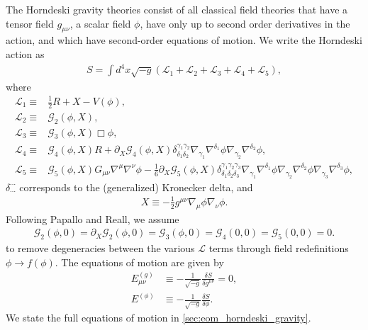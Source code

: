 \documentclass{ws-ijmpd}
\begin{document}
The Horndeski gravity theories consist of all classical field theories
that have a tensor field $g_{\mu\nu}$, a scalar field $\phi$, 
have only up to second order derivatives in the action,
and which have second-order equations of 
motion\cite{horndeski_paper,Deffayet:2009wt,Deffayet:2011gz}.
We write the Horndeski action as
\begin{align}
\label{eq:general_horndeski_action}
   S
   =
   \int d^4x\sqrt{-g}
   \left(
      \mathcal{L}_1
      +
      \mathcal{L}_2
      +
      \mathcal{L}_3
      +
      \mathcal{L}_4
      +
      \mathcal{L}_5
   \right)
   ,
\end{align}
where
\begin{align}
   \mathcal{L}_1
   \equiv&
   \frac{1}{2}R
   +
   X
   -
   V\left(\phi\right)
   ,\\
   \mathcal{L}_2
   \equiv&
   \mathcal{G}_2\left(\phi,X\right)
   ,\\
   \mathcal{L}_3
   \equiv&
   \mathcal{G}_3\left(\phi,X\right)\Box\phi
   ,\\
   \mathcal{L}_4
   \equiv&
   \mathcal{G}_4\left(\phi,X\right)R
   +
   \partial_X\mathcal{G}_4\left(\phi,X\right)
   \delta^{\gamma_1\gamma_2}_{\delta_1\delta_2}
   \nabla_{\gamma_1}\nabla^{\delta_1}\phi
   \nabla_{\gamma_2}\nabla^{\delta_2}\phi
   ,\\
   \mathcal{L}_5
   \equiv&
   \mathcal{G}_5\left(\phi,X\right)G_{\mu\nu}\nabla^{\mu}\nabla^{\nu}\phi
   -
   \frac{1}{6}\partial_X\mathcal{G}_5\left(\phi,X\right)
   \delta^{\gamma_1\gamma_2\gamma_3}_{\delta_1\delta_2\delta_3}
   \nabla_{\gamma_1}\nabla^{\delta_1}\phi
   \nabla_{\gamma_2}\nabla^{\delta_2}\phi
   \nabla_{\gamma_3}\nabla^{\delta_3}\phi
   ,
\end{align}
$\delta^{\cdots}_{\cdots}$ corresponds to the (generalized) Kronecker delta,
and
\begin{align}
   X
   \equiv
   -
   \frac{1}{2}g^{\mu\nu}\nabla_{\mu}\phi\nabla_{\nu}\phi
   .
\end{align}
Following Papallo and Reall\cite{Papallo:2017qvl}, we assume
\begin{align}
   \label{eq:coefficient_assumptions}
   \mathcal{G}_2\left(\phi,0\right)
   =
   \partial_X\mathcal{G}_2\left(\phi,0\right)
   =
   \mathcal{G}_3\left(\phi,0\right)
   =
   \mathcal{G}_4\left(0,0\right)
   =
   \mathcal{G}_5\left(0,0\right)
   =
   0
   .
\end{align}
to remove degeneracies between the various $\mathcal{L}$ terms
through field redefinitions $\phi\to f(\phi)$.
The equations of motion are given by
\begin{align}
   E^{(g)}_{\mu\nu}
   &\equiv
   -
   \frac{1}{\sqrt{-g}}\frac{\delta S}{\delta g^{\mu\nu}}
   =
   0
   ,\\
   E^{(\phi)}
   &\equiv
   -
   \frac{1}{\sqrt{-g}}\frac{\delta S}{\delta\phi} 
   .
\end{align}
We state the full equations of motion in \ref{sec:eom_horndeski_gravity}.
\end{document}
